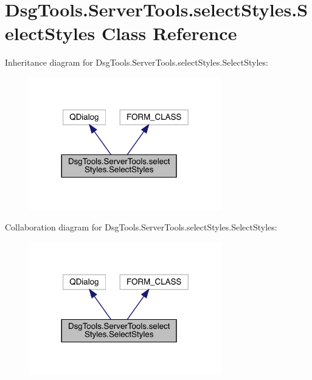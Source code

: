 \hypertarget{class_dsg_tools_1_1_server_tools_1_1select_styles_1_1_select_styles}{}\section{Dsg\+Tools.\+Server\+Tools.\+select\+Styles.\+Select\+Styles Class Reference}
\label{class_dsg_tools_1_1_server_tools_1_1select_styles_1_1_select_styles}


Inheritance diagram for Dsg\+Tools.\+Server\+Tools.\+select\+Styles.\+Select\+Styles\+:
\nopagebreak
\begin{figure}[H]
\begin{center}
\leavevmode
\includegraphics[width=236pt]{class_dsg_tools_1_1_server_tools_1_1select_styles_1_1_select_styles__inherit__graph}
\end{center}
\end{figure}


Collaboration diagram for Dsg\+Tools.\+Server\+Tools.\+select\+Styles.\+Select\+Styles\+:
\nopagebreak
\begin{figure}[H]
\begin{center}
\leavevmode
\includegraphics[width=236pt]{class_dsg_tools_1_1_server_tools_1_1select_styles_1_1_select_styles__coll__graph}
\end{center}
\end{figure}
